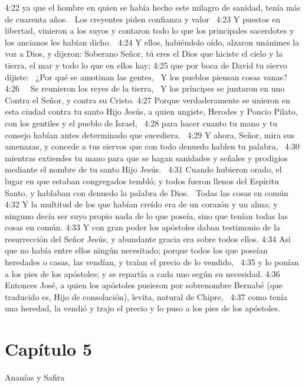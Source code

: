 4:22 ya que el hombre en quien se había hecho este milagro de sanidad, tenía más de cuarenta años.  
Los creyentes piden confianza y valor  
4:23 Y puestos en libertad, vinieron a los suyos y contaron todo lo que los principales sacerdotes y los ancianos les habían dicho.  
4:24 Y ellos, habiéndolo oído, alzaron unánimes la voz a Dios, y dijeron: Soberano Señor, tú eres el Dios que hiciste el cielo y la tierra, el mar y todo lo que en ellos hay; 
4:25 que por boca de David tu siervo dijiste:  
¿Por qué se amotinan las gentes,  
Y los pueblos piensan cosas vanas?  
4:26   Se reunieron los reyes de la tierra,  
Y los príncipes se juntaron en uno  
Contra el Señor, y contra su Cristo. 
4:27 Porque verdaderamente se unieron en esta ciudad contra tu santo Hijo Jesús, a quien ungiste, Herodes y Poncio Pilato, con los gentiles y el pueblo de Israel,  
4:28 para hacer cuanto tu mano y tu consejo habían antes determinado que sucediera.  
4:29 Y ahora, Señor, mira sus amenazas, y concede a tus siervos que con todo denuedo hablen tu palabra,  
4:30 mientras extiendes tu mano para que se hagan sanidades y señales y prodigios mediante el nombre de tu santo Hijo Jesús.  
4:31 Cuando hubieron orado, el lugar en que estaban congregados tembló; y todos fueron llenos del Espíritu Santo, y hablaban con denuedo la palabra de Dios.  
Todas las cosas en común  
4:32 Y la multitud de los que habían creído era de un corazón y un alma; y ninguno decía ser suyo propio nada de lo que poseía, sino que tenían todas las cosas en común. 
4:33 Y con gran poder los apóstoles daban testimonio de la resurrección del Señor Jesús, y abundante gracia era sobre todos ellos. 
4:34 Así que no había entre ellos ningún necesitado; porque todos los que poseían heredades o casas, las vendían, y traían el precio de lo vendido,  
4:35 y lo ponían a los pies de los apóstoles; y se repartía a cada uno según su necesidad. 
4:36 Entonces José, a quien los apóstoles pusieron por sobrenombre Bernabé (que traducido es, Hijo de consolación), levita, natural de Chipre,  
4:37 como tenía una heredad, la vendió y trajo el precio y lo puso a los pies de los apóstoles.  
\section*{Capítulo 5 }
Ananías y Safira 

